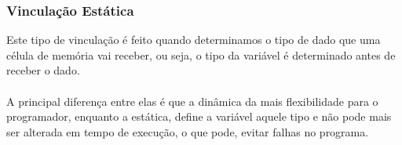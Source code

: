\documentclass[12pt, onecolumn]{article}
\begin{document}
	\subsubsection{\hspace{1cm}Vinculação Estática}
	Este tipo de vinculação é feito quando determinamos o tipo de dado que 
	uma célula de memória vai receber, ou seja, o tipo da variável é determinado
	antes de receber o dado.\\
	\\
	A principal diferença entre elas é que a dinâmica da mais flexibilidade 
	para o programador, enquanto a estática, define a variável aquele tipo e 
	não pode mais ser alterada em tempo de execução, o que pode, evitar falhas
	no programa.
\end{document}
